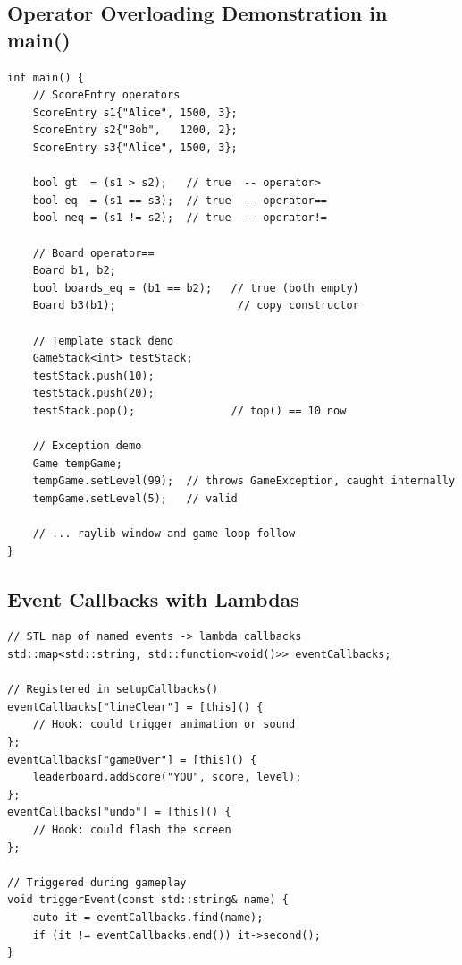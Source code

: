 \documentclass[11pt]{article}
\begin{document}
\subsection{Operator Overloading Demonstration in main()}

\begin{lstlisting}[caption={Operator overloading demonstrated in main()}]
int main() {
    // ScoreEntry operators
    ScoreEntry s1{"Alice", 1500, 3};
    ScoreEntry s2{"Bob",   1200, 2};
    ScoreEntry s3{"Alice", 1500, 3};

    bool gt  = (s1 > s2);   // true  -- operator>
    bool eq  = (s1 == s3);  // true  -- operator==
    bool neq = (s1 != s2);  // true  -- operator!=

    // Board operator==
    Board b1, b2;
    bool boards_eq = (b1 == b2);   // true (both empty)
    Board b3(b1);                   // copy constructor

    // Template stack demo
    GameStack<int> testStack;
    testStack.push(10);
    testStack.push(20);
    testStack.pop();               // top() == 10 now

    // Exception demo
    Game tempGame;
    tempGame.setLevel(99);  // throws GameException, caught internally
    tempGame.setLevel(5);   // valid

    // ... raylib window and game loop follow
}
\end{lstlisting}

\subsection{Event Callbacks with Lambdas}

\begin{lstlisting}[caption={Lambda-based event system in Game using std::map}]
// STL map of named events -> lambda callbacks
std::map<std::string, std::function<void()>> eventCallbacks;

// Registered in setupCallbacks()
eventCallbacks["lineClear"] = [this]() {
    // Hook: could trigger animation or sound
};
eventCallbacks["gameOver"] = [this]() {
    leaderboard.addScore("YOU", score, level);
};
eventCallbacks["undo"] = [this]() {
    // Hook: could flash the screen
};

// Triggered during gameplay
void triggerEvent(const std::string& name) {
    auto it = eventCallbacks.find(name);
    if (it != eventCallbacks.end()) it->second();
}
\end{lstlisting}

\end{document}
